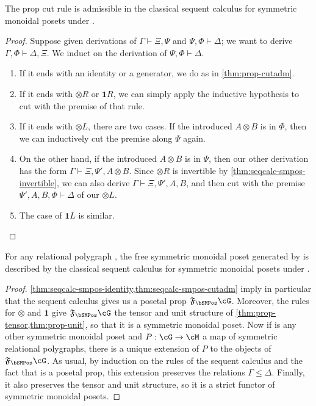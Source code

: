 \documentclass{book}
\let\types\vdash
\newcommand{\F}[1]{\mathfrak{F}_{#1}}
\def\one{\mathbf{1}}
\let\tensor\otimes
\def\tensorL{\mathord{\tensor}L}
\def\tensorR{\mathord{\tensor}R}
\begin{document}
\begin{thm}\label{thm:seqcalc-smpos-cutadm}
  The prop cut rule is admissible in the classical sequent calculus for symmetric monoidal posets under \cG.
\end{thm}
\begin{proof}
  Suppose given derivations of $\Gamma\types\Xi,\Psi$ and $\Psi,\Phi \types \Delta$; we want to derive $\Gamma,\Phi \types \Delta,\Xi$.
  We induct on the derivation of $\Psi,\Phi \types \Delta$.
  \begin{enumerate}
  \item If it ends with an identity or a generator, we do as in \cref{thm:prop-cutadm}.
  \item If it ends with $\tensorR$ or $\one R$, we can simply apply the inductive hypothesis to cut with the premise of that rule.
  \item If it ends with $\tensorL$, there are two cases.
    If the introduced $A\tensor B$ is in $\Phi$, then we can inductively cut the premise along $\Psi$ again.
  \item On the other hand, if the introduced $A\tensor B$ is in $\Psi$, then our other derivation has the form $\Gamma\types\Xi,\Psi',A\tensor B$.
    Since $\tensorR$ is invertible by \cref{thm:seqcalc-smpos-invertible}, we can also derive $\Gamma\types\Xi,\Psi',A,B$, and then cut with the premise $\Psi',A,B,\Phi \types \Delta$ of our $\tensorL$.
  \item The case of $\one L$ is similar.\qedhere
  \end{enumerate}
\end{proof}

\begin{thm}\label{thm:seqcalc-smpos-initial}
  For any relational polygraph \cG, the free symmetric monoidal poset generated by \cG is described by the classical sequent calculus for symmetric monoidal posets under \cG.
\end{thm}
\begin{proof}
  \cref{thm:seqcalc-smpos-identity,thm:seqcalc-smpos-cutadm} imply in particular that the sequent calculus gives us a posetal prop $\F\bSMPos\cG$.
  Moreover, the rules for $\tensor$ and $\one$ give $\F\bSMPos\cG$ the tensor and unit structure of \cref{thm:prop-tensor,thm:prop-unit}, so that it is a symmetric monoidal poset.
  Now if \cM is any other symmetric monoidal poset and $P:\cG\to\cM$ a map of symmetric relational polygraphs, there is a unique extension of $P$ to the objects of $\F\bSMPos\cG$.
  As usual, by induction on the rules of the sequent calculus and the fact that \cM is a posetal prop, this extension preserves the relations $\Gamma\le\Delta$.
  Finally, it also preserves the tensor and unit structure, so it is a strict functor of symmetric monoidal posets.
\end{proof}
\end{document}
